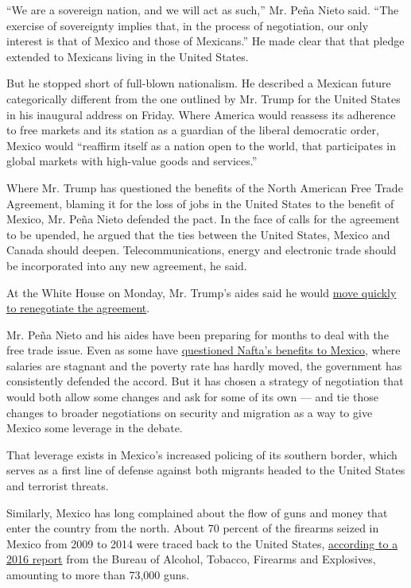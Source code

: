 ``We are a sovereign nation, and we will act as such,'' Mr. Peña Nieto
said. ``The exercise of sovereignty implies that, in the process of
negotiation, our only interest is that of Mexico and those of
Mexicans.'' He made clear that that pledge extended to Mexicans living
in the United States.

But he stopped short of full-blown nationalism. He described a Mexican
future categorically different from the one outlined by Mr. Trump for
the United States in his inaugural address on Friday. Where America
would reassess its adherence to free markets and its station as a
guardian of the liberal democratic order, Mexico would ``reaffirm itself
as a nation open to the world, that participates in global markets with
high-value goods and services.''

Where Mr. Trump has questioned the benefits of the North American Free
Trade Agreement, blaming it for the loss of jobs in the United States to
the benefit of Mexico, Mr. Peña Nieto defended the pact. In the face of
calls for the agreement to be upended, he argued that the ties between
the United States, Mexico and Canada should deepen. Telecommunications,
energy and electronic trade should be incorporated into any new
agreement, he said.

At the White House on Monday, Mr. Trump's aides said he would
\href{https://www.nytimes.com/2017/01/23/us/politics/tpp-trump-trade-nafta.html?ref=business}{move
quickly to renegotiate the agreement}.

Mr. Peña Nieto and his aides have been preparing for months to deal with
the free trade issue. Even as some have
\href{https://www.nytimes.com/2017/01/04/world/americas/mexico-donald-trump-nafta.html}{questioned
Nafta's benefits to Mexico}, where salaries are stagnant and the poverty
rate has hardly moved, the government has consistently defended the
accord. But it has chosen a strategy of negotiation that would both
allow some changes and ask for some of its own --- and tie those changes
to broader negotiations on security and migration as a way to give
Mexico some leverage in the debate.

That leverage exists in Mexico's increased policing of its southern
border, which serves as a first line of defense against both migrants
headed to the United States and terrorist threats.

Similarly, Mexico has long complained about the flow of guns and money
that enter the country from the north. About 70 percent of the firearms
seized in Mexico from 2009 to 2014 were traced back to the United
States, \href{http://www.gao.gov/products/GAO-16-223}{according to a
2016 report} from the Bureau of Alcohol, Tobacco, Firearms and
Explosives, amounting to more than 73,000 guns.

